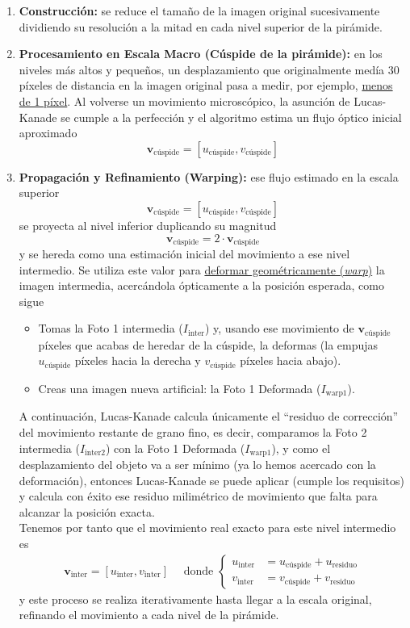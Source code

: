 \begin{enumerate}
    \item \textbf{Construcción:} se reduce el tamaño de la imagen original sucesivamente dividiendo su resolución a la mitad en cada nivel superior de la pirámide.
    \item \textbf{Procesamiento en Escala Macro (Cúspide de la pirámide):} en los niveles más altos y pequeños, un desplazamiento que originalmente medía 30 píxeles de distancia en la imagen original pasa a medir, por ejemplo, \underline{menos de 1 píxel}. Al volverse un movimiento microscópico, la asunción de Lucas-Kanade se cumple a la perfección y el algoritmo estima un flujo óptico inicial aproximado 
    $$\mathbf{v}_{\text{cúspide}}=[u_{\text{cúspide}}, v_{\text{cúspide}}]$$
    \item \textbf{Propagación y Refinamiento (Warping):} ese flujo estimado en la escala superior $$\mathbf{v}_{\text{cúspide}}=[u_{\text{cúspide}}, v_{\text{cúspide}}]$$
    se proyecta al nivel inferior duplicando su magnitud
    $$\mathbf{v}_{\text{cúspide}} = 2 \cdot \mathbf{v}_{\text{cúspide}}$$
    y se hereda como una estimación inicial del movimiento a ese nivel intermedio. Se utiliza este valor para \underline{deformar geométricamente (\textit{warp})} la imagen intermedia, acercándola ópticamente a la posición esperada, como sigue
    \begin{itemize}
        \item Tomas la Foto 1 intermedia ($I_{\text{inter}}$) y, usando ese movimiento de $\mathbf{v}_{\text{cúspide}}$ píxeles que acabas de heredar de la cúspide, la deformas (la empujas $u_{\text{cúspide}}$ píxeles hacia la derecha y $v_{\text{cúspide}}$ píxeles hacia abajo). 
        \item Creas una imagen nueva artificial: la Foto 1 Deformada ($I_{\text{warp1}}$).
    \end{itemize}
    A continuación, Lucas-Kanade calcula únicamente el ``residuo de corrección'' del movimiento restante de grano fino, es decir, comparamos la Foto 2 intermedia ($I_{\text{inter2}}$) con la Foto 1 Deformada ($I_{\text{warp1}}$), y como el desplazamiento del objeto va a ser mínimo (ya lo hemos acercado con la deformación), entonces Lucas-Kanade se puede aplicar (cumple los requisitos) y calcula con éxito ese residuo milimétrico de movimiento que falta para alcanzar la posición exacta.\\

    \noindent
    Tenemos por tanto que el movimiento real exacto para este nivel intermedio es 
    \begin{align*}
        \mathbf{v}_{\text{inter}} = [u_{\text{inter}}, v_{\text{inter}} ]\quad \text{ donde } \begin{cases}
        u_{\text{inter}} &= u_{\text{cúspide}} + u_{\text{residuo}} \\
        v_{\text{inter}} &= v_{\text{cúspide}} + v_{\text{residuo}}
        \end{cases}
    \end{align*}
    y este proceso se realiza iterativamente hasta llegar a la escala original, refinando el movimiento a cada nivel de la pirámide.


\end{enumerate}
